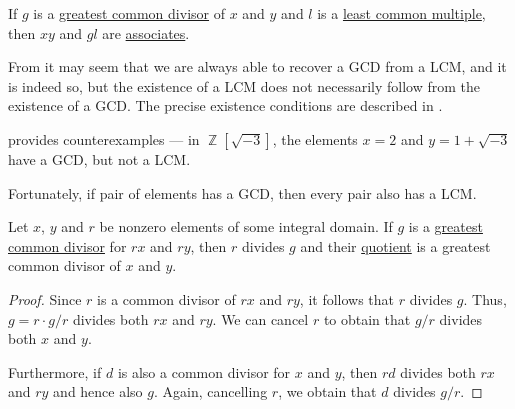 \begin{proposition}\label{thm:gcd_and_lcm}
  If \( g \) is a \hyperref[def:gcd]{greatest common divisor} of \( x \) and \( y \) and \( l \) is a \hyperref[def:lcm]{least common multiple}, then \( xy \) and \( gl \) are \hyperref[def:domain_divisibility/associates]{associates}.
\end{proposition}

\begin{remark}\label{rem:gcd_but_no_lcm}
  From  it may seem that we are always able to recover a GCD from a LCM, and it is indeed so, but the existence of a LCM does not necessarily follow from the existence of a GCD. The precise existence conditions are described in .

   provides counterexamples --- in \( \BbbZ[\sqrt{-3}] \), the elements \( x = 2 \) and \( y = 1 + \sqrt{-3} \) have a GCD, but not a LCM.

  Fortunately, if  pair of elements has a GCD, then every pair also has a LCM.
\end{remark}

\begin{lemma}\label{thm:gcd_of_multiple}
  Let \( x \), \( y \) and \( r \) be nonzero elements of some integral domain. If \( g \) is a \hyperref[def:gcd]{greatest common divisor} for \( rx \) and \( ry \), then \( r \) divides \( g \) and their \hyperref[def:domain_quotient]{quotient} is a greatest common divisor of \( x \) and \( y \).
\end{lemma}
\begin{proof}
  Since \( r \) is a common divisor of \( rx \) and \( ry \), it follows that \( r \) divides \( g \). Thus, \( g = r \cdot g / r \) divides both \( rx \) and \( ry \). We can cancel \( r \) to obtain that \( g / r \) divides both \( x \) and \( y \).

  Furthermore, if \( d \) is also a common divisor for \( x \) and \( y \), then \( rd \) divides both \( rx \) and \( ry \) and hence also \( g \). Again, cancelling \( r \), we obtain that \( d \) divides \( g / r \).
\end{proof}

